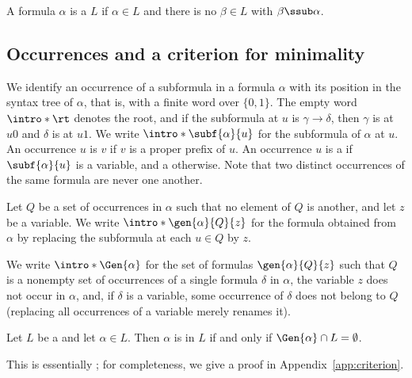 \begin{definition}
\AP A formula $\alpha$ is  a  $L$ if
$\alpha\in L$ and there is no $\beta\in L$ with $\beta\ssub\alpha$.
\end{definition}

\subsection{Occurrences and a criterion for minimality}

\AP We identify an occurrence of a subformula in a formula $\alpha$ with its
position in the syntax tree of $\alpha$, that is, with a finite word over
$\{0,1\}$. The empty word $\intro*\rt$ denotes the root, and if
the subformula at $u$ is $\gamma\to\delta$, then $\gamma$ is at $u0$ and
$\delta$ is at $u1$. We write $\intro*\subf{\alpha}{u}$ for the subformula
of $\alpha$ at $u$. An occurrence $u$ is  $v$ if $v$
is a proper prefix of $u$. An occurrence $u$ is a  if
$\subf{\alpha}{u}$ is a variable, and a 
otherwise. Note that two distinct occurrences of the same formula are never
 one another.

\AP Let $Q$ be a set of occurrences in $\alpha$ such that no element of
$Q$ is  another, and let $z$ be a variable. We write
$\intro*\gen{\alpha}{Q}{z}$
for the formula obtained from $\alpha$ by replacing the subformula at each
$u\in Q$ by $z$.

\AP We write $\intro*\Gen{\alpha}$ for the set of formulas
$\gen{\alpha}{Q}{z}$ such that $Q$ is a nonempty set of occurrences of a single
formula $\delta$ in $\alpha$, the variable $z$ does not occur in $\alpha$,
and, if $\delta$ is a variable, some occurrence of $\delta$ does not belong
to $Q$ (replacing all occurrences of a variable merely renames it).

\begin{proposition}\label{cor:criterion}
Let $L$ be a  and let $\alpha\in L$. Then $\alpha$ is  in $L$
if and only if $\Gen{\alpha}\cap L=\emptyset$.
\end{proposition}

This is essentially \cite[Props.~3.1 and~3.2]{NM21}; for completeness, we
give a proof in Appendix~\ref{app:criterion}.
